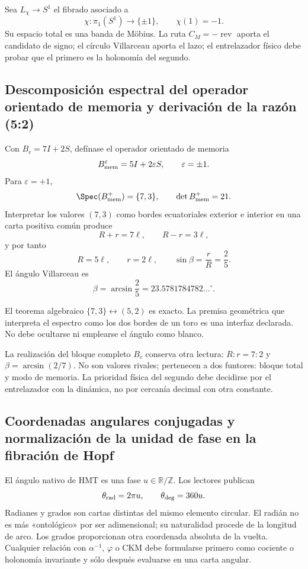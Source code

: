 Sea \(L_\chi\to S^1\) el fibrado asociado a
\[
\chi:\pi_1(S^1)\longrightarrow\{\pm1\},
\qquad \chi(1)=-1.
\]
Su espacio total es una banda de Möbius. La ruta \(C_M=-\operatorname{rev}\)
aporta el candidato de signo; el círculo Villarceau aporta el lazo; el
entrelazador físico debe probar que el primero es la holonomía del segundo.

\subsection{Descomposición espectral del operador orientado de memoria y derivación de la razón (5{:}2)}

Con \(B_c=7I+2S\), defínase el operador orientado de memoria
\[
B_{\rm mem}^{\varepsilon}=5I+2\varepsilon S,
\qquad\varepsilon=\pm1.
\]
Para \(\varepsilon=+1\),
\[
\Spec(B_{\rm mem}^{+})=\{7,3\},
\qquad\det B_{\rm mem}^{+}=21.
\]
Interpretar los valores \((7,3)\) como bordes ecuatoriales exterior e interior
en una carta positiva común produce
\[
R+r=7\ell,\qquad R-r=3\ell,
\]
y por tanto
\[
R=5\ell,\qquad r=2\ell,\qquad
\sin\beta=\frac rR=\frac25.
\]
El ángulo Villarceau es
\[
\beta=\arcsin\frac25
=23.5781784782\ldots^\circ.
\]

El teorema algebraico \(\{7,3\}\leftrightarrow(5,2)\) es exacto. La premisa
geométrica que interpreta el espectro como los dos bordes de un toro es una
interfaz declarada. No debe ocultarse ni emplearse el ángulo como blanco.

La realización del bloque completo \(B_c\) conserva otra lectura:
\(R:r=7:2\) y \(\beta=\arcsin(2/7)\). No son valores rivales; pertenecen a
dos funtores: bloque total y modo de memoria. La prioridad física del segundo
debe decidirse por el entrelazador con la dinámica, no por cercanía decimal con
otra constante.

\subsection{Coordenadas angulares conjugadas y normalización de la unidad de fase en la fibración de Hopf}

El ángulo nativo de HMT es una fase \(u\in\mathbb R/\mathbb Z\). Los lectores
publican
\[
\theta_{\rm rad}=2\pi u,
\qquad
\theta_{\rm deg}=360u.
\]
Radianes y grados son cartas distintas del mismo elemento circular. El radián
no es más «ontológico» por ser adimensional; su naturalidad procede de la
longitud de arco. Los grados proporcionan otra coordenada absoluta de la
vuelta. Cualquier relación con \(\alpha^{-1}\), \(\varphi\) o CKM debe
formularse primero como cociente o holonomía invariante y sólo después
evaluarse en una carta angular.

